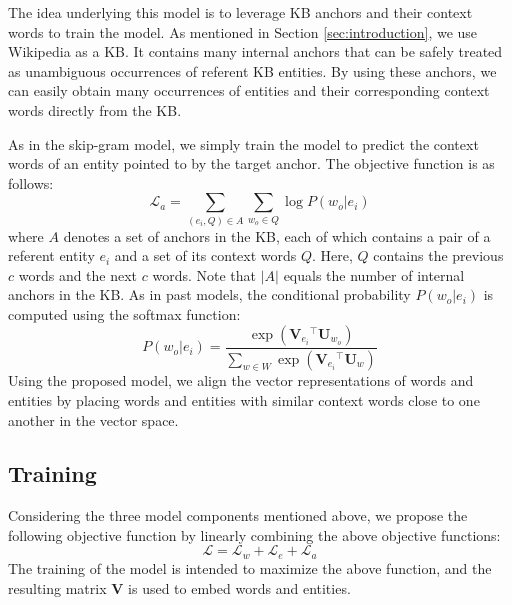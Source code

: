 \documentclass[11pt,letterpaper]{article}
\begin{document}
The idea underlying this model is to leverage KB anchors and their context words to train the model.
As mentioned in Section \ref{sec:introduction}, we use Wikipedia as a KB.
It contains many internal anchors that can be safely treated as unambiguous occurrences of referent KB entities.
By using these anchors, we can easily obtain many occurrences of entities and their corresponding context words directly from the KB.

As in the skip-gram model, we simply train the model to predict the context words of an entity pointed to by the target anchor.
The objective function is as follows:
\begin{equation}
\mathcal{L}_a = \sum_{(e_i, Q) \in A}\sum_{w_o \in Q}\log P(w_o|e_i)
\label{objective_alignment}
\end{equation}
where $A$ denotes a set of anchors in the KB, each of which contains a pair of a referent entity $e_i$ and a set of its context words $Q$.
Here, $Q$ contains the previous $c$ words and the next $c$ words.
Note that $|A|$ equals the number of internal anchors in the KB.
As in past models, the conditional probability $P(w_o|e_i)$ is computed using the softmax function:
\begin{equation}
P(w_o|e_i) = \frac{\exp(\mathbf{V}_{e_i}\!^\top \mathbf{U}_{w_o})}{\sum_{w \in W}\exp(\mathbf{V}_{e_i}\!^\top \mathbf{U}_w)}
\label{softmax_alignment}
\end{equation}
Using the proposed model, we align the vector representations of words and entities by placing words and entities with similar context words close to one another in the vector space.

\subsection{Training}

Considering the three model components mentioned above, we propose the following objective function by linearly combining the above objective functions:
\begin{equation}
\mathcal{L} = \mathcal{L}_w + \mathcal{L}_e + \mathcal{L}_a
\end{equation}
The training of the model is intended to maximize the above function, and the resulting matrix $\mathbf{V}$ is used to embed words and entities.
\end{document}
